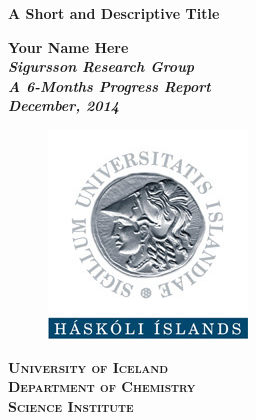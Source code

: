 \documentclass[a4paper,oneside,12pt]{article}
\begin{document}

\begin{titlepage}

\begin{center}
\Large{\textbf{A Short and Descriptive Title}}
\end{center}

\vspace{1cm}
\thispagestyle{empty}

\begin{center}
\large{
\textbf{
Your Name Here\\
\vspace{1cm}
\textit{Sigur\dh sson Research Group\\
A 6-Months Progress Report\\
December, 2014}
}
}
\end{center}

\vspace{10cm}

\begin{figure}[h!]
	\begin{center}
		\includegraphics[scale=2]{figures/UIlogo}
	\end{center}
	\label{logo}
\end{figure}

\begin{center}
\textsc{
\textbf{
University of Iceland \\
Department of Chemistry \\
Science Institute
}
}
\end{center}

\end{titlepage}

\tableofcontents








\newpage
{} \label{bibliography}
\printbibliography[resetnumbers=true]

\newpage
{} \label{listoffig}
\listoffigures

\newpage
{} \label{listofschemes}
\listofschemes

\end{document}
